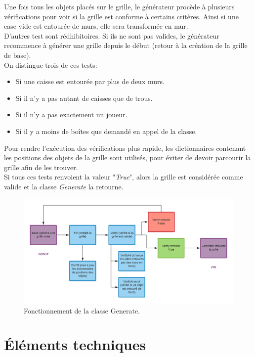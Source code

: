 \documentclass[a4paper,12pt]{article}
\begin{document}
Une fois tous les objets placés sur le grille, le générateur procède à plusieurs vérifications pour voir si la grille est conforme à certains critères. Ainsi si une case vide est entourée de murs, elle sera transformée en mur.\\
D'autres test sont rédhibitoires. Si ils ne sont pas valides, le générateur recommence à générer une grille depuis le début (retour à la création de la grille de base).\\
On distingue trois de ces tests:
\begin{itemize}
    \item Si une caisse est entourée par plus de deux murs.
    \item Si il n'y a pas autant de caisses que de trous.
    \item Si il n'y a pas exactement un joueur.
    \item Si il y a moins de boîtes que demandé en appel de la classe.
\end{itemize}
Pour rendre l'exécution des vérifications plus rapide, les dictionnaires contenant les positions des objets de la grille sont utilisés, pour éviter de devoir parcourir la grille afin de les trouver.\\
Si tous ces tests renvoient la valeur "\textit{True}", alors la grille est considérée comme valide et la classe \textit{Generate} la retourne.

\begin{figure}[H]
\center
\includegraphics[scale = 0.90]{./Illustrations/generate.png}
\caption{Fonctionnement de la classe Generate.}
\end{figure}

\newpage

\section{Éléments techniques}
\end{document}

